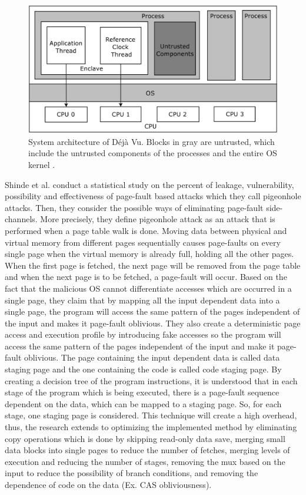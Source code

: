 \begin{figure}
	\includegraphics[scale=0.2]{images/dejavu}
	\caption{System architecture of Déjà Vu. Blocks in gray are untrusted, which include the untrusted components of the processes and the entire OS kernel \cite{dejavu}.}
	\label{fig:dejavu}
\end{figure}

Shinde et al. \cite{pigeonhole} conduct a statistical study on the percent of leakage, vulnerability, possibility and effectiveness of page-fault based attacks which they call pigeonhole attacks. Then, they consider the possible ways of eliminating page-fault side-channels. More precisely, they define pigeonhole attack as an attack that is performed when a page table walk is done. Moving data between physical and virtual memory from different pages sequentially causes page-faults on every single page when the virtual memory is already full, holding all the other pages. When the first page is fetched, the next page will be removed from the page table and when the next page is to be fetched, a page-fault will occur. Based on the fact that the malicious OS cannot differentiate accesses which are occurred in a single page, they claim that by mapping all the input dependent data into a single page, the program will access the same pattern of the pages independent of the input and makes it page-fault oblivious. They also create a deterministic page access and execution profile by introducing fake accesses so the program will access the same pattern of the pages independent of the input and make it page-fault oblivious. The page containing the input dependent data is called data staging page and the one containing the code is called code staging page. By creating a decision tree of the program instructions, it is understood that in each stage of the program which is being executed, there is a page-fault sequence dependent on the data, which can be mapped to a staging page. So, for each stage, one staging page is considered. This technique will create a high overhead, thus, the research extends to optimizing the implemented method by eliminating copy operations which is done by skipping read-only data save, merging small data blocks into single pages to reduce the number of fetches, merging levels of execution and reducing the number of stages, removing the mux based on the input to reduce the possibility of branch conditions, and removing the dependence of code on the data (Ex. CAS obliviousness).

